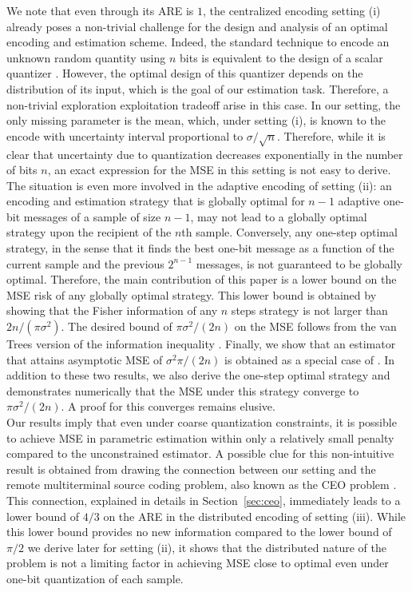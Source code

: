 \documentclass[letterpaper, conference]{IEEEtran}      %
\begin{document}
We note that even through its ARE is $1$, the centralized encoding setting (i) already poses a non-trivial challenge for the design and analysis of an optimal encoding and estimation scheme. Indeed, the standard technique to encode an unknown random quantity using $n$ bits is equivalent to the design of a scalar quantizer \cite{gray1998quantization}. However, the optimal design of this quantizer depends on the distribution of its input, which is the goal of our estimation task. Therefore, a non-trivial exploration exploitation tradeoff arise in this case. In our setting, the only missing parameter is the mean, which, under setting (i), is known to the encode with uncertainty interval proportional to $\sigma/\sqrt{n}$. Therefore, while it is clear that uncertainty due to quantization decreases exponentially in the number of bits $n$, an exact expression for the MSE in this setting is not easy to derive. The situation is even more involved in the adaptive encoding of setting (ii): an encoding and estimation strategy that is globally optimal for $n-1$ adaptive one-bit messages of a sample of size $n-1$, may not lead to a globally optimal strategy upon the recipient of the $n$th sample. Conversely, any one-step optimal strategy, in the sense that it finds the best one-bit message as a function of the current sample and the previous $2^{n-1}$ messages, is not guaranteed to be globally optimal. Therefore, the main contribution of this paper is a lower bound on the MSE risk of any globally optimal strategy. This lower bound is obtained by showing that the Fisher information of any $n$ steps strategy is not larger than $2n/(\pi \sigma^2)$. The desired bound of $\pi \sigma^2/(2n)$ on the MSE follows from the van Trees version of the information inequality \cite{gill1995applications}. Finally, we show that an estimator that attains asymptotic MSE of $\sigma^2\pi/(2n)$ is obtained as a special case of \cite[Thm. 4]{polyak1992acceleration}. In addition to these two results, we also derive the one-step optimal strategy and demonstrates numerically that  the MSE under this strategy converge to $\pi \sigma^2/(2n)$. A proof for this converges remains elusive. \\

Our results imply that even under coarse quantization constraints, it is possible to achieve MSE in parametric estimation within only a relatively small penalty compared to the unconstrained estimator. A possible clue for this non-intuitive result is obtained from drawing the connection between our setting and the remote multiterminal source coding problem, also known as the CEO problem \cite{berger1996ceo, viswanathan1997quadratic, oohama1998rate, prabhakaran2004rate}. This connection, explained in details in Section~\ref{sec:ceo}, immediately leads to a lower bound of $4/3$ on the ARE in the distributed encoding of setting (iii). While this lower bound provides no new information compared to the lower bound of $\pi /2$ we derive later for setting (ii), it shows that the distributed nature of the problem is not a limiting factor in achieving MSE close to optimal even under one-bit quantization of each sample. \\
\end{document}
